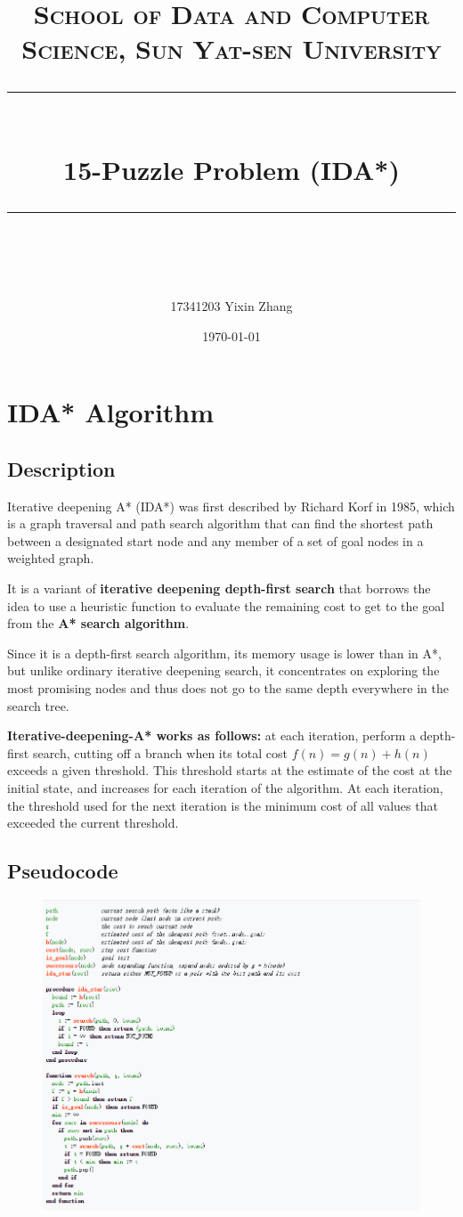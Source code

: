 \documentclass[a4paper, 11pt]{article}
\title{	
\normalfont \normalsize
\textsc{School of Data and Computer Science, Sun Yat-sen University} \\ [25pt] %
\rule{\textwidth}{0.5pt} \\[0.4cm] %
\huge 15-Puzzle Problem (IDA*)\\ %
\rule{\textwidth}{2pt} \\[0.5cm] %
\author{17341203 Yixin Zhang}
\date{\normalsize\today}
}
\begin{document}
\maketitle
\tableofcontents
\newpage

\section{IDA* Algorithm}
\subsection{Description}
Iterative deepening A* (IDA*) was first described by Richard Korf in 1985, which is a graph traversal and path search algorithm that can find the shortest path between a designated start node and any member of a set of goal nodes in a weighted graph. 

It is a variant of \textbf{iterative deepening depth-first search} that borrows the idea to use a heuristic function to evaluate the remaining cost to get to the goal from the \textbf{A* search algorithm}. 

Since it is a depth-first search algorithm, its memory usage is lower than in A*, but unlike ordinary iterative deepening search, it concentrates on exploring the most promising nodes and thus does not go to the same depth everywhere in the search tree. 

\textbf{Iterative-deepening-A* works as follows:} at each iteration, perform a depth-first search, cutting off a branch when its total cost $f(n)=g(n)+h(n)$ exceeds a given threshold. This threshold starts at the estimate of the cost at the initial state, and increases for each iteration of the algorithm. At each iteration, the threshold used for the next iteration is the minimum cost of all values that exceeded the current threshold.


\subsection{Pseudocode}
\begin{figure}[ht]
\centering
\includegraphics[width=17.3cm]{assets/code}
\end{figure}
\end{document}
